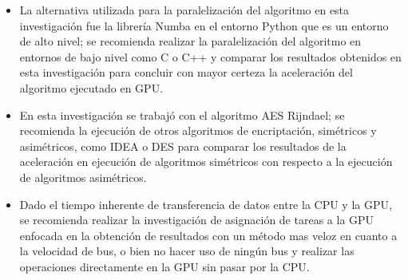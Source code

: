 \documentclass[../main/main.tex]{subfiles}
\begin{document}
\espacio

  \begin{itemize}[noitemsep,nolistsep]
    \item La alternativa utilizada para la paralelización del algoritmo en esta investigación fue la librería Numba en el entorno Python que es un entorno de alto nivel; se recomienda realizar la paralelización del algoritmo en entornos de bajo nivel como C o C++ y comparar los resultados obtenidos en esta investigación para concluir con mayor certeza la aceleración del algoritmo ejecutado en GPU.
    \item En esta investigación se trabajó con el algoritmo AES Rijndael; se recomienda la ejecución de otros algoritmos de encriptación, simétricos y asimétricos, como IDEA o DES para comparar los resultados de la aceleración en ejecución de algoritmos simétricos con respecto a la ejecución de algoritmos asimétricos.
    \item Dado el tiempo inherente de transferencia de datos entre la CPU y la GPU, se recomienda realizar la investigación de asignación de tareas a la GPU enfocada en la obtención de resultados con un método mas veloz en cuanto a la velocidad de bus, o bien no hacer uso de ningún bus y realizar las operaciones directamente en la GPU sin pasar por la CPU.
  \end{itemize}
\end{document}
